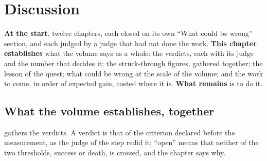 
\chapter{Discussion}\label{t3dis:ch}

\begin{origine}
\textbf{At the start}, twelve chapters, each closed on its own ``What could be wrong'' section, and each judged by a judge that had not done the work.
\textbf{This chapter establishes} what the volume says as a whole: the verdicts, each with its judge and the number that decides it; the struck-through figures, gathered together; the lesson of the quest; what could be wrong at the scale of the volume; and the work to come, in order of expected gain, costed where it is.
\textbf{What remains} is to do it.
\end{origine}

\section{What the volume establishes, together}\label{t3dis:sec:bilan}

 gathers the verdicts. A verdict is that of the criterion declared before the measurement, as the judge of the step redid it; ``open'' means that neither of the two thresholds, success or death, is crossed, and the chapter says why.

